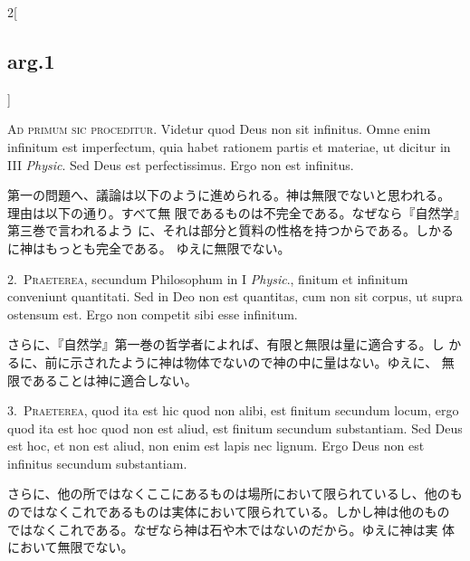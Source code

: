 \documentclass[paper=a4paper,fontsize=10pt,jafontsize=9pt,titlepage]{jlreq}
\begin{document}
{}
\setcounter{section}{1}
\setcounter{subsection}{0}

\begin{paracol}{2}[\subsection{arg.1}]

{\huge A}{\scshape d primum sic proceditur}. Videtur quod Deus non sit
infinitus. Omne enim infinitum est imperfectum, quia habet rationem
partis et materiae, ut dicitur in III {\itshape Physic}. Sed Deus est
perfectissimus. Ergo non est infinitus.

\switchcolumn

第一の問題へ、議論は以下のように進められる。神は無限でないと思われる。
 理由は以下の通り。すべて無
 限であるものは不完全である。なぜなら『自然学』第三巻で言われるよう
 に、それは部分と質料の性格を持つからである。しかるに神はもっとも完全である。
 ゆえに無限でない。


2.~{\scshape Praeterea}, secundum Philosophum in I {\itshape Physic}., finitum et
infinitum conveniunt quantitati. Sed in Deo non est quantitas, cum non
sit corpus, ut supra ostensum est. Ergo non competit sibi esse
infinitum.

\switchcolumn

さらに、『自然学』第一巻の哲学者によれば、有限と無限は量に適合する。し
 かるに、前に示されたように神は物体でないので神の中に量はない。ゆえに、
 無限であることは神に適合しない。


3.~{\scshape Praeterea}, quod ita est hic quod non alibi, est finitum secundum
locum, ergo quod ita est hoc quod non est aliud, est finitum secundum
substantiam. Sed Deus est hoc, et non est aliud, non enim est lapis nec
lignum. Ergo Deus non est infinitus secundum substantiam.

\switchcolumn

さらに、他の所ではなくここにあるものは場所において限られているし、他のも
 のではなくこれであるものは実体において限られている。しかし神は他のもの
 ではなくこれである。なぜなら神は石や木ではないのだから。ゆえに神は実
 体において無限でない。


\end{paracol}
\end{document}
